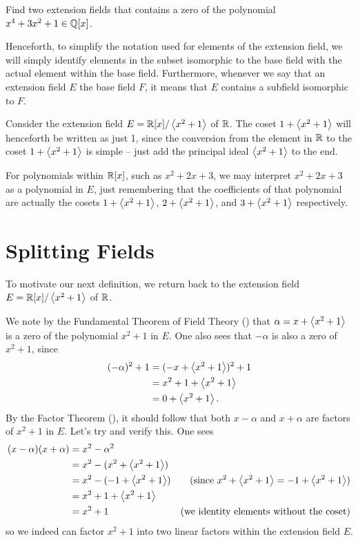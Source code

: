 \begin{exercise}
    Find two extension fields that contains a zero of the polynomial $x^4 + 3x^2 + 1 \in \mathbb{Q}[x]$.
\end{exercise}

Henceforth, to simplify the notation used for elements of the extension field, we will simply identify elements in the subset isomorphic to the base field with the actual element within the base field. Furthermore, whenever we say that an extension field $E$  the base field $F$, it means that $E$ contains a subfield isomorphic to $F$.

\begin{example}
    Consider the extension field $E = \mathbb{R}[x]/\left\langle x^2+1\right\rangle$ of $\mathbb{R}$. The coset $1 + \left\langle x^2+1\right\rangle$ will henceforth be written as just 1, since the conversion from the element in $\mathbb{R}$ to the coset $1 + \left\langle x^2+1\right\rangle$ is simple -- just add the principal ideal $\left\langle x^2+1\right\rangle$ to the end.

    For polynomials within $\mathbb{R}[x]$, such as $x^2 + 2x + 3$, we may interpret $x^2 + 2x + 3$ as a polynomial in $E$, just remembering that the coefficients of that polynomial are actually the cosets $1 + \left\langle x^2+1\right\rangle$, $2 + \left\langle x^2+1\right\rangle$, and $3 + \left\langle x^2+1\right\rangle$ respectively.
\end{example}

\section{Splitting Fields}
To motivate our next definition, we return back to the extension field $E = \mathbb{R}[x]/\left\langle x^2+1\right\rangle$ of $\mathbb{R}$.
\begin{example}
    We note by the Fundamental Theorem of Field Theory () that $\alpha = x + \left\langle x^2+1\right\rangle$ is a zero of the polynomial $x^2+1$ in $E$. One also sees that $-\alpha$ is also a zero of $x^2+1$, since
    \begin{align*}
        (-\alpha)^2 + 1 &= (-x + \left\langle x^2+1\right\rangle)^2 + 1\\
        &= x^2 + 1 + \left\langle x^2+1\right\rangle\\
        &= 0 + \left\langle x^2+1\right\rangle.
    \end{align*}
    By the Factor Theorem (), it should follow that both $x - \alpha$ and $x + \alpha$ are factors of $x^2 + 1$ in $E$. Let's try and verify this. One sees
    \begin{align*}
        (x-\alpha)(x+\alpha) &= x^2 - \alpha^2\\
        &= x^2 - (x^2 + \left\langle x^2+1\right\rangle)\\
        &= x^2 - (-1 + \left\langle x^2+1\right\rangle) & (\text{since } x^2 + \left\langle x^2+1\right\rangle = -1 + \left\langle x^2+1\right\rangle)\\
        &= x^2 + 1 + \left\langle x^2+1\right\rangle\\
        &= x^2 + 1 & (\text{we identity elements without the coset})
    \end{align*}
    so we indeed can factor $x^2 + 1$ into two linear factors within the extension field $E$.
\end{example}

